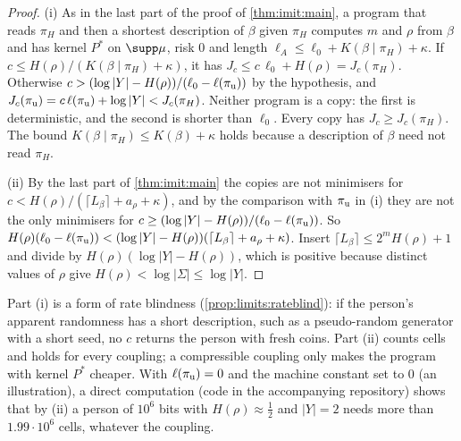\begin{proof}
(i) As in the last part of the proof of \cref{thm:imit:main}, a program that reads $\pi_H$ and then a shortest description of $\beta$ given $\pi_H$ computes $m$ and $\rho$ from $\beta$ and has kernel $P^*$ on $\supp\mu$, risk $0$ and length $\ell_A\le\ell_0+K(\beta\mid\pi_H)+\kappa$. If $c\le H(\rho)/(K(\beta\mid\pi_H)+\kappa)$, it has $J_c\le c\,\ell_0+H(\rho)=J_c(\pi_H)$. Otherwise $c>(\log|Y|-H(\rho))/(\ell_0-\ell(\pi_{\rm u}))$ by the hypothesis, and $J_c(\pi_{\rm u})=c\,\ell(\pi_{\rm u})+\log|Y|<J_c(\pi_H)$. Neither program is a copy: the first is deterministic, and the second is shorter than $\ell_0$. Every copy has $J_c\ge J_c(\pi_H)$. The bound $K(\beta\mid\pi_H)\le K(\beta)+\kappa$ holds because a description of $\beta$ need not read $\pi_H$.

(ii) By the last part of \cref{thm:imit:main} the copies are not minimisers for $c<H(\rho)/(\lceil L_\beta\rceil+a_\rho+\kappa)$, and by the comparison with $\pi_{\rm u}$ in (i) they are not the only minimisers for $c\ge(\log|Y|-H(\rho))/(\ell_0-\ell(\pi_{\rm u}))$. So $H(\rho)(\ell_0-\ell(\pi_{\rm u}))<(\log|Y|-H(\rho))(\lceil L_\beta\rceil+a_\rho+\kappa)$. Insert $\lceil L_\beta\rceil\le2^mH(\rho)+1$ and divide by $H(\rho)(\log|Y|-H(\rho))$, which is positive because distinct values of $\rho$ give $H(\rho)<\log|\Sigma|\le\log|Y|$.
\end{proof}

Part (i) is a form of rate blindness (\cref{prop:limits:rateblind}): if the person's apparent randomness has a short description, such as a pseudo-random generator with a short seed, no $c$ returns the person with fresh coins. Part (ii) counts cells and holds for every coupling; a compressible coupling only makes the program with kernel $P^*$ cheaper. With $\ell(\pi_{\rm u})=0$ and the machine constant set to $0$ (an illustration), a direct computation (code in the accompanying repository) shows that by (ii) a person of $10^6$ bits with $H(\rho)\approx\frac12$ and $|Y|=2$ needs more than $1.99\cdot10^6$ cells, whatever the coupling.
